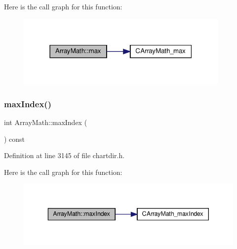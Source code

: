 Here is the call graph for this function\+:
\nopagebreak
\begin{figure}[H]
\begin{center}
\leavevmode
\includegraphics[width=295pt]{class_array_math_ae80c440e5ad866929649746c029cf0bf_cgraph}
\end{center}
\end{figure}
\mbox{\label{class_array_math_af75557e958d76b32d93a6a90fa6d064c}} 
\subsubsection{\texorpdfstring{max\+Index()}{maxIndex()}}
{\footnotesize\ttfamily int Array\+Math\+::max\+Index (\begin{DoxyParamCaption}{ }\end{DoxyParamCaption}) const\hspace{0.3cm}{\ttfamily [inline]}}



Definition at line 3145 of file chartdir.\+h.

Here is the call graph for this function\+:
\nopagebreak
\begin{figure}[H]
\begin{center}
\leavevmode
\includegraphics[width=343pt]{class_array_math_af75557e958d76b32d93a6a90fa6d064c_cgraph}
\end{center}
\end{figure}
\mbox{\label{class_array_math_ab2f502a58518cfe68bcdaa31729d4a96}} 
